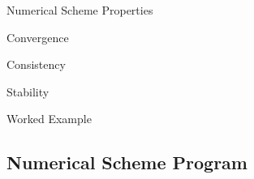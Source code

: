 \documentclass{article}
\begin{document}
\begin{section}{Numerical Scheme Properties}

  \begin{subsection}{Convergence}
  \end{subsection}

  \begin{subsection}{Consistency}
  \end{subsection}

  \begin{subsection}{Stability}
  \end{subsection}

\end{section}


\begin{section}{Worked Example}
\end{section}


\newpage
\begin{appendices}
  \section{Numerical Scheme Program}
\end{appendices}
\end{document}
